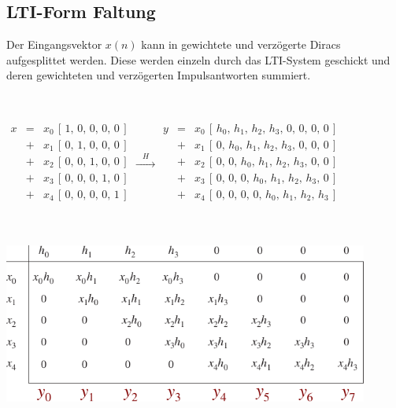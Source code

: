 	\subsection{LTI-Form Faltung }
		\begin{minipage}{0.37\textwidth}
		 	Der Eingangsvektor $x(n)$ kann in gewichtete und verzögerte Diracs aufgesplittet werden. Diese werden einzeln durch das LTI-System geschickt und deren gewichteten und verzögerten Impulsantworten summiert.
		 \end{minipage}\begin{minipage}{0.03\textwidth}$ $\end{minipage}
		 \begin{minipage}{0.62\textwidth}
		 	$\begin{array}{lcl}
		 	  x& = &x_0\,[\,1,\,0,\,0,\,0,\,0\,]\\
		 	   & + &x_1\,[\,0,\,1,\,0,\,0,\,0\,]\\
		 	   & + &x_2\,[\,0,\,0,\,1,\,0,\,0\,]\\
		 	   & + &x_3\,[\,0,\,0,\,0,\,1,\,0\,]\\
		 	   & + &x_4\,[\,0,\,0,\,0,\,0,\,1\,]\\
		 	 \end{array}\xrightarrow {\;\;\;H\;\;\;}
		 	 \begin{array}{lcl}
		 	  y& = &x_0\,[\,h_0,\,h_1,\,h_2,\,h_3,\,0,\,0,\,0,\,0\,]\\
		 	   & + &x_1\,[\,0,\,h_0,\,h_1,\,h_2,\,h_3,\,0,\,0,\,0\,]\\
		 	   & + &x_2\,[\,0,\,0,\,h_0,\,h_1,\,h_2,\,h_3,\,0,\,0\,]\\
		 	   & + &x_3\,[\,0,\,0,\,0,\,h_0,\,h_1,\,h_2,\,h_3,\,0\,]\\
		 	   & + &x_4\,[\,0,\,0,\,0,\,0,\,h_0,\,h_1,\,h_2,\,h_3\,]\\
		 	 \end{array}$
		\end{minipage}\\[0.2cm]

		\begin{minipage}{0.7\textwidth}
		 	\includegraphics[width = 0.9\textwidth]{pic/LTITab.pdf}
		\end{minipage}
		\begin{minipage}{0.3\textwidth}
		\end{minipage}
